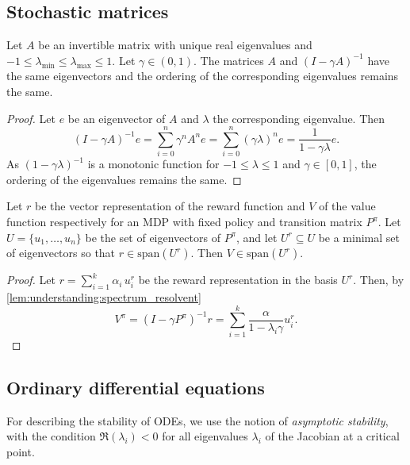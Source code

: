 \subsection{Stochastic matrices}
\begin{lemma}\label{lem:understanding:spectrum_resolvent}
    Let $A$ be an invertible matrix with unique real eigenvalues and $-1 \leq \lambda_{\min} \leq \lambda_{\max} \leq 1 $. Let $\gamma\in(0,1)$.
    The matrices $A$ and $(I - \gamma A)^{-1}$ have the same eigenvectors and the ordering of the corresponding eigenvalues remains the same.
\end{lemma}

\begin{proof}
    Let $e$ be an eigenvector of $A$ and $\lambda$ the corresponding eigenvalue. Then $$(I - \gamma A)^{-1}e = \sum_{i=0}^n \gamma^n A^ne = \sum_{i=0}^n (\gamma\lambda)^n e = \frac{1}{1 - \gamma\lambda}e.$$ As $(1-\gamma\lambda)^{-1}$ is a monotonic function for $-1 \leq \lambda \leq 1$ and $\gamma\in[0,1]$, the ordering of the eigenvalues remains the same.
\end{proof}

\begin{lemma}\label{lem:understanding:spectrum_rew_value}
    Let $r$ be the vector representation of the reward function and $V$ of the value function respectively for an MDP with fixed policy and transition matrix $P^\pi$.
    Let $U = \{u_1,\dots,u_n\}$ be the set of eigenvectors of $P^\pi$, and let $U^r \subseteq U$ be a minimal set of eigenvectors so that $r \in \mathrm{span}(U^r)$.
    Then $V \in \mathrm{span}(U^r)$.
\end{lemma}
\begin{proof}
    Let $r = \sum_{i=1}^k \alpha_i\, u^r_i$ be the reward representation in the basis $U^r$. Then, by \autoref{lem:understanding:spectrum_resolvent} $$V^\pi = (I - \gamma P^\pi)^{-1} r = \sum_{i=1}^k \frac{\alpha}{1 - \lambda_i\gamma}  u^r_i.$$
\end{proof}


\subsection{Ordinary differential equations}

For describing the stability of ODEs, we use the notion of \emph{asymptotic stability}, with the condition $\Re(\lambda_i) < 0$ for all eigenvalues $\lambda_i$ of the Jacobian at a critical point.

